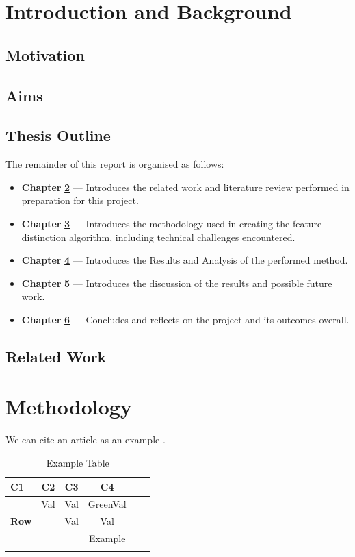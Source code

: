 \documentclass[12pt, a4paper]{report}
\begin{document}
\chapter{Introduction and Background}
\label{Chap2}
\section{Motivation}
\lipsum[1-3]
\section{Aims}
\lipsum[6]
\section{Thesis Outline}
The remainder of this report is organised as follows:
\begin{itemize}
    \item[] \textbf{Chapter} \hyperref[Chap2]{\textbf{2}} --- Introduces the related work and literature review performed in preparation for this project.
    \item[] \textbf{Chapter} \hyperref[Chap3]{\textbf{3}} --- Introduces the methodology used in creating the feature distinction algorithm, including technical challenges encountered.
    \item[] \textbf{Chapter} \hyperref[Chap4]{\textbf{4}} --- Introduces the Results and Analysis of the performed method.
    \item[] \textbf{Chapter} \hyperref[Chap5]{\textbf{5}} --- Introduces the discussion of the results and possible future work.
    \item[] \textbf{Chapter} \hyperref[Chap6]{\textbf{6}} --- Concludes and reflects on the project and its outcomes overall.
\end{itemize}
\section{Related Work}

\chapter{Methodology}
\label{Chap3}
We can cite an article as an example \cite{DeepMindRef}. \lipsum[4-8]
\begin{table}[H]
   \caption{Example Table }\label{tab:exampleTable}
   \small
   \centering
   \begin{tabular}{lccccr}
   \toprule[\heavyrulewidth]\toprule[\heavyrulewidth]
   \textbf{C1} & \textbf{C2} & \textbf{C3} & \textbf{C4}\\ 
   \midrule
\multirow{3}{*}{\textbf{Row}}& Val & Val & \textcolor{igreen}{GreenVal}\\
   & & Val  & \textcolor{igreen}{Val}\\
& &  & \textcolor{igreen}{Example}\\ \hdashline
   \bottomrule[\heavyrulewidth] 
   \end{tabular}
\end{table}
\end{document}
